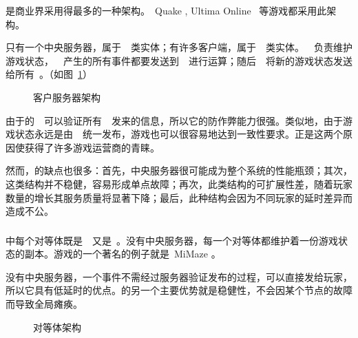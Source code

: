 {\csa}是商业界采用得最多的一种架构。~Quake \cite{quake}, Ultima Online \cite{ultima}~等游戏都采用此架构。

{\csa}只有一个中央服务器，属于~\gss~类实体；有许多客户端，属于~\ioc~类实体。~\gss~负责维护游戏状态，~\ioc~产生的所有事件都要发送到~\gss~进行运算；随后~\gss~将新的游戏状态发送给所有~\ioc。（如图~\ref{CS}）

\begin{figure}[htbp]
\begin{center}
\caption{客户\/服务器架构}
\label{CS}
\end{center}
\end{figure}

由于{\csa}的~\gss~可以验证所有~\ioc~发来的信息，所以它的防作弊能力很强。类似地，由于游戏状态永远是由~\gss~统一发布，游戏也可以很容易地达到一致性要求。正是这两个原因使{\csa}获得了许多游戏运营商的青睐。

然而，{\csa}的缺点也很多：首先，中央服务器很可能成为整个系统的性能瓶颈；其次，这类结构并不稳健，容易形成单点故障；再次，此类结构的可扩展性差，随着玩家数量的增长其服务质量将显著下降；最后，此种结构会因为不同玩家的延时差异而造成不公。

\subsubsection{\pa}

{\pa}中每个对等体既是~\ioc~又是~\gss。没有中央服务器，每一个对等体都维护着一份游戏状态的副本。{\pa}游戏的一个著名的例子就是~MiMaze \cite{mimaze}。

{\pa}没有中央服务器，一个事件不需经过服务器验证发布的过程，可以直接发给玩家，所以它具有低延时的优点。{\pa}的另一个主要优势就是稳健性，不会因某个节点的故障而导致全局瘫痪。

\begin{figure}[htbp]
\begin{center}
\caption{对等体架构}
\label{P2P}
\end{center}
\end{figure}

